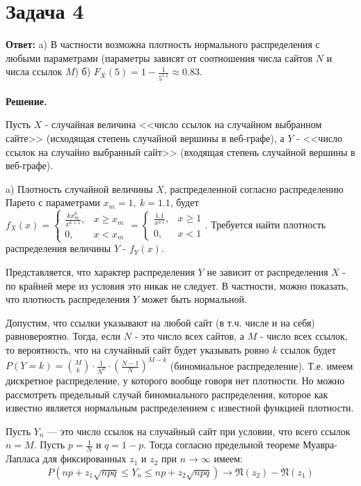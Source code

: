 \documentclass{article}
\begin{document}
\section*{Задача 4}
{\bf Ответ: } a) В частности возможна плотность нормального распределения с любыми параметрами (параметры зависят от соотношения числа сайтов $N$ и числа ссылок $M$) б) $F_X(5)=1-\frac{1}{5^{1.1}}\approx 0.83$.
 \\
 \\
{\bf Решение.}
 \par
 Пусть $X$ - случайная величина <<число ссылок на случайном выбранном сайте>> (исходящая степень случайной вершины в веб-графе), а $Y$ - <<число ссылок на случайно выбранный сайт>> (входящая степень случайной вершины в веб-графе).
 \par
 a) Плотность случайной величины $X$, распределенной согласно распределению Парето с параметрами $x_m=1,\ k=1.1$, будет $f_X(x)=
 \begin{cases}
    \frac{kx_m^k}{x^{k+1}}, &x \geq x_m\\
    0, &x < x_m
 \end{cases} =
 \begin{cases}
   \frac{1.1}{x^{2.1}}, &x \geq 1\\
   0,& x < 1
 \end{cases}$.
 Требуется найти плотность распределения величины $Y$ - $f_Y(x)$.
 \par
 Представляется, что характер распределения $Y$ не зависит от распределения $X$ - по крайней мере из условия это никак не следует. В частности, можно показать, что плотность распределения $Y$ может быть нормальной.
 \par
 Допустим, что ссылки указывают на любой сайт (в т.ч. числе и на себя) равновероятно. Тогда, если $N$ - это число всех сайтов, а $M$ - число всех ссылок, то вероятность, что на случайный сайт будет указывать ровно $k$ ссылок будет $P(Y=k)=\binom{M}{k} \cdot\frac{1}{N^k}\cdot\left(\frac{N-1}{N}\right)^{M-k}$ (биномиальное распределение). Т.е. имеем дискретное распределение, у которого вообще говоря нет плотности. Но можно рассмотреть предельный случай биномиального распределения, которое как известно является нормальным распределением с известной функцией плотности.
 \par
 Пусть $Y_n$ — это число ссылок на случайный сайт при условии, что всего ссылок $n=M$. Пусть $p=\frac{1}{N}$ и $q=1-p$. Тогда согласно предельной теореме Муавра-Лапласа для фиксированных $z_1$ и $z_2$ при $n\to\infty$ имеем:
 $$P(np+z_1\sqrt{npq}\leq Y_n\leq np+z_2\sqrt{npq})\to \mathfrak{N}(z_2)-\mathfrak{N}(z_1)$$
\end{document}
